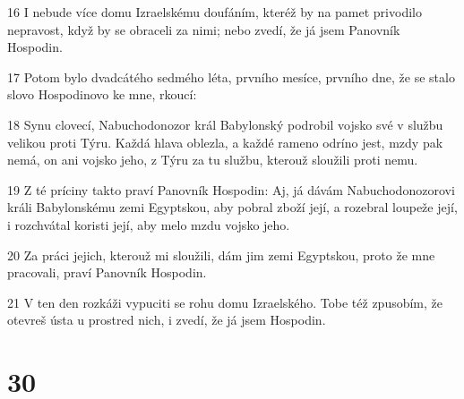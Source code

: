 \par 16 I nebude více domu Izraelskému doufáním, kteréž by na pamet privodilo nepravost, když by se obraceli za nimi; nebo zvedí, že já jsem Panovník Hospodin.
\par 17 Potom bylo dvadcátého sedmého léta, prvního mesíce, prvního dne, že se stalo slovo Hospodinovo ke mne, rkoucí:
\par 18 Synu clovecí, Nabuchodonozor král Babylonský podrobil vojsko své v službu velikou proti Týru. Každá hlava oblezla, a každé rameno odríno jest, mzdy pak nemá, on ani vojsko jeho, z Týru za tu službu, kterouž sloužili proti nemu.
\par 19 Z té príciny takto praví Panovník Hospodin: Aj, já dávám Nabuchodonozorovi králi Babylonskému zemi Egyptskou, aby pobral zboží její, a rozebral loupeže její, i rozchvátal koristi její, aby melo mzdu vojsko jeho.
\par 20 Za práci jejich, kterouž mi sloužili, dám jim zemi Egyptskou, proto že mne pracovali, praví Panovník Hospodin.
\par 21 V ten den rozkáži vypuciti se rohu domu Izraelského. Tobe též zpusobím, že otevreš ústa u prostred nich, i zvedí, že já jsem Hospodin.

\chapter{30}

